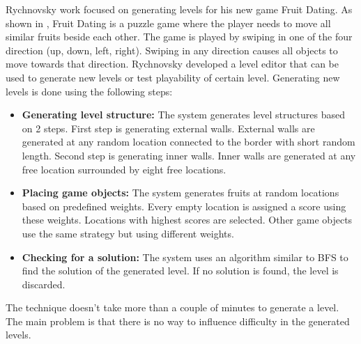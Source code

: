 Rychnovsky\cite{fruitDatingPCG} work focused on generating levels for his new game Fruit Dating. As shown in , Fruit Dating is a puzzle game where the player needs to move all similar fruits beside each other. The game is played by swiping in one of the four direction (up, down, left, right). Swiping in any direction causes all objects to move towards that direction. Rychnovsky developed a level editor that can be used to generate new levels or test playability of certain level. Generating new levels is done using the following steps: 
\begin{itemize} \itemsep0pt \parskip0pt 
	\item \textbf{Generating level structure:} The system generates level structures based on 2 steps. First step is generating external walls. External walls are generated at any random location connected to the border with short random length. Second step is generating inner walls. Inner walls are generated at any free location surrounded by eight free locations.
	\item \textbf{Placing game objects:} The system generates fruits at random locations based on predefined weights. Every empty location is assigned a score using these weights. Locations with highest scores are selected. Other game objects use the same strategy but using different weights.
	\item \textbf{Checking for a solution:} The system uses an algorithm similar to BFS to find the solution of the generated level. If no solution is found, the level is discarded.
\end{itemize}
The technique doesn't take more than a couple of minutes to generate a level. The main problem is that there is no way to influence difficulty in the generated levels.


